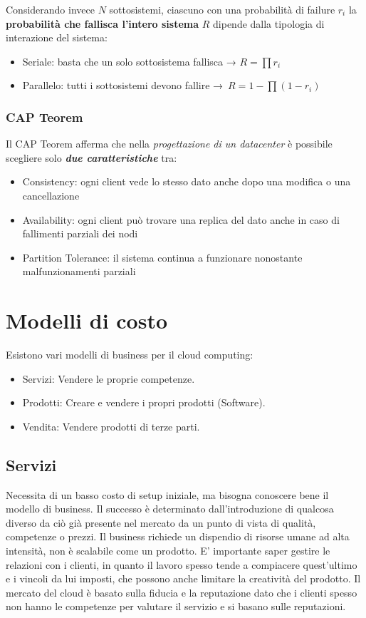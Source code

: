 \documentclass{article}
\providecommand{\tightlist}{%
		  \setlength{\itemsep}{0pt}\setlength{\parskip}{0pt}}
\begin{document}
		
		Considerando invece \(N\) sottosistemi, ciascuno con una
		probabilità di failure \(r_i\) la \textbf{probabilità
			che fallisca l'intero sistema} \(R\) dipende dalla
		tipologia di interazione del sistema:
		
		\begin{itemize}
			\tightlist
			\item
			Seriale: basta che un solo sottosistema fallisca →
			\(R=\prod r_i\)
			\item
			Parallelo: tutti i sottosistemi devono fallire
			→~\(R = 1- \prod (1-r_i)\)
		\end{itemize}
		
		\subsubsection{CAP Teorem}\label{cap-teorem}
		
		Il CAP Teorem afferma che nella \emph{progettazione di un
			datacenter} è possibile scegliere solo \textbf{\emph{due
				caratteristiche}} tra:
			\begin{itemize}
				\item Consistency: ogni client vede lo stesso dato anche dopo una modifica o una cancellazione
				\item Availability: ogni client può trovare una replica del dato anche in caso di fallimenti parziali dei nodi
				\item Partition Tolerance: il sistema continua a funzionare nonostante malfunzionamenti parziali
			\end{itemize}
		
		\newpage
		\section{Modelli di costo}
		Esistono vari modelli di business per il cloud computing:
		\begin{itemize}
			\item Servizi: Vendere le proprie competenze.
			\item Prodotti: Creare e vendere i propri prodotti (Software).
			\item Vendita: Vendere prodotti di terze parti.
		\end{itemize}
		
		\subsection{Servizi}
		Necessita di un basso costo di setup iniziale, ma bisogna conoscere bene il modello di business. Il successo è determinato dall'introduzione di qualcosa diverso da ciò già presente nel mercato da un punto di vista di qualità, competenze o prezzi.
		Il business richiede un dispendio di risorse umane ad alta intensità, non è scalabile come un prodotto. E' importante saper gestire le relazioni con i clienti, in quanto il lavoro spesso tende a compiacere quest'ultimo e i vincoli da lui imposti, che possono anche limitare la creatività del prodotto.
		Il mercato del cloud è basato sulla fiducia e la reputazione dato che i clienti spesso non hanno le competenze per valutare il servizio e si basano sulle reputazioni.
		
\end{document}
